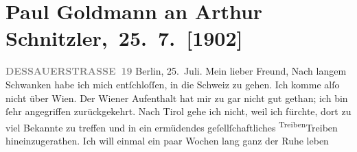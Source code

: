 

         
         \renewcommand{\erwaehntePersonen}{Personen: Otto Brahm, Paul Goldmann, Raphael Löwenfeld, Walther Rathenau, Olga Schnitzler, Elisabeth Steinrück}
         \renewcommand{\erwaehnteInstitutionen}{Institutionen: S. Hirzel Verlag (Leipzig), Schiller-Theater}
         \renewcommand{\erwaehnteOrte}{Orte: Berlin, Dessauer Straße, Kaltenleutgeben, Leipzig, Schweiz, Südtirol, Tirol, Wien}
         \renewcommand{\erwaehnteWerke}{Werke: Der Schleier der Beatrice. Schauspiel in fünf Akten, Impressionen}
               \section[ Paul Goldmann an Arthur Schnitzler, 25. 7. {[}1902{]}]{ Paul Goldmann an Arthur Schnitzler, 25. 7. {[}1902{]}}\nopagebreak{}\rehead{ }\begin{ledgroupsized}[t]{13cm}\normalsize\beginnumbering{} \toendnotes[C]{\smallbreak\pagebreak[2]} 
\toendnotes[C]{\smallbreak}\pstart
           \noindent{}\raggedleft{}{\pb}\textcolor{gray}{\textbf{DESSAUERSTRASSE 19}}\pend
           \pstart
           Berlin, 25. Juli.\pend
           \pstart\center{}Mein lieber Freund,\pend\pstart
           Nach langem Schwanken habe ich mich entſchloſſen, in die Schweiz zu gehen. Ich komme alſo nicht über Wien. Der Wiener Aufenthalt
               hat mir zu \label{K_L03214-1v}\label{K_L03214-1h} gar nicht gut gethan; ich  bin ſehr
               angegriffen zurückgekehrt. Nach Tirol
               gehe ich nicht, weil ich fürchte, dort zu viel Bekannte zu treffen und in ein
               ermüdendes geſellſchaftliches {\pb}\substVorne{}\textsuperscript{Treiben}{\allowbreak}\substDazwischen{}Treiben\substHinten{} hineinzugerathen. Ich will einmal ein paar Wochen lang ganz der Ruhe leben

\end{ledgroupsized}
